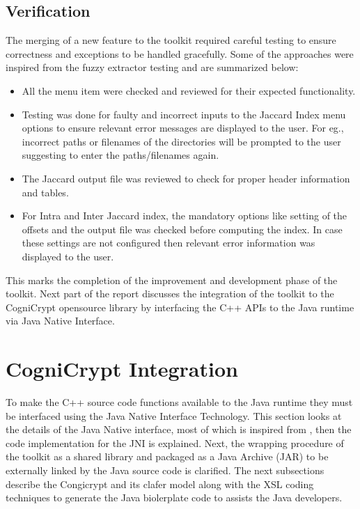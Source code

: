 \subsection{Verification}
The merging of a new feature to the toolkit required careful testing to ensure correctness and exceptions to be handled gracefully. Some of the approaches were inspired from the fuzzy extractor testing and are summarized below:
\begin{itemize}
	\item All the menu item were checked and reviewed for their expected functionality.
	\item Testing was done for faulty and incorrect inputs to the Jaccard Index menu options to ensure relevant error messages are displayed to the user. For eg., incorrect paths or filenames of the directories will be prompted to the user suggesting to enter the paths/filenames again.
	\item The Jaccard output file was reviewed to check for proper header information and tables.
	\item For Intra and Inter Jaccard index, the mandatory options like setting of the offsets and the output file was checked before computing the index. In case these settings are not configured then relevant error information was displayed to the user.
\end{itemize}

This marks the completion of the improvement and development phase of the toolkit. Next part of the report discusses the integration of the toolkit to the CogniCrypt opensource library by interfacing the C++ APIs to the Java runtime via Java Native Interface.

\section{CogniCrypt Integration}

To make the C++ source code functions available to the Java runtime they must be interfaced using the Java Native Interface Technology. This section looks at the details of the Java Native interface, most of which is inspired from \cite{jni}, then the code implementation for the JNI is explained. Next, the wrapping procedure of the toolkit as a shared library and packaged as a Java Archive (JAR) to be externally linked by the Java source code is clarified. The next subsections describe the Congicrypt and its clafer model
along with the XSL coding techniques to generate the Java biolerplate code to assists the Java developers.

